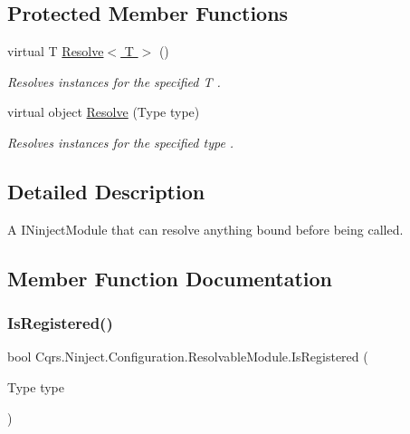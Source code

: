 \subsection*{Protected Member Functions}
\begin{DoxyCompactItemize}
\item 
virtual T \hyperlink{classCqrs_1_1Ninject_1_1Configuration_1_1ResolvableModule_a41a1826cee70c7627e6ec1ef0053f1ea_a41a1826cee70c7627e6ec1ef0053f1ea}{Resolve$<$ T $>$} ()
\begin{DoxyCompactList}\small\item\em Resolves instances for the specified {\itshape T} . \end{DoxyCompactList}\item 
virtual object \hyperlink{classCqrs_1_1Ninject_1_1Configuration_1_1ResolvableModule_a182fa5666c70e6871aa371fc81fb788d_a182fa5666c70e6871aa371fc81fb788d}{Resolve} (Type type)
\begin{DoxyCompactList}\small\item\em Resolves instances for the specified {\itshape type} . \end{DoxyCompactList}\end{DoxyCompactItemize}


\subsection{Detailed Description}
A I\+Ninject\+Module that can resolve anything bound before being called. 



\subsection{Member Function Documentation}
\mbox{\label{classCqrs_1_1Ninject_1_1Configuration_1_1ResolvableModule_ae5b77cb7b9b0b826a603fea25609a1ac_ae5b77cb7b9b0b826a603fea25609a1ac}} 
\subsubsection{\texorpdfstring{Is\+Registered()}{IsRegistered()}}
{\footnotesize\ttfamily bool Cqrs.\+Ninject.\+Configuration.\+Resolvable\+Module.\+Is\+Registered (\begin{DoxyParamCaption}\item[{Type}]{type }\end{DoxyParamCaption})}



